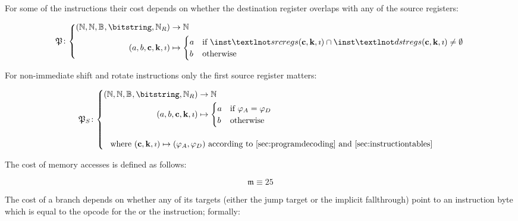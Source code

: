 For some of the instructions their cost depends on whether the destination register overlaps with any of the source registers:

\begin{equation}
  \mathfrak{P}\colon \abracegroup{
    (\N, \N, \blob, \bitstring, \pvmreg) &\to \N\\
    (a, b, \mathbf{c}, \mathbf{k}, \imath) &\mapsto \begin{cases}
      a &\when \inst¬srcregs(\mathbf{c}, \mathbf{k}, \imath) \cap \inst¬dstregs(\mathbf{c}, \mathbf{k}, \imath) \neq \emptyset \\
      b &\otherwise
    \end{cases}
  }
\end{equation}

For non-immediate shift and rotate instructions only the first source register matters:

\begin{equation}
  \mathfrak{P}_{S}\colon \abracegrouptwo{
    (\N, \N, \blob, \bitstring, \pvmreg) &\to \N\\
    (a, b, \mathbf{c}, \mathbf{k}, \imath) &\mapsto \begin{cases}
      a &\when \reg_A = \reg_D \\
      b &\otherwise
    \end{cases}\\
  }{
    \\[0.2pt]
    &\where (\mathbf{c}, \mathbf{k}, \imath) \mapsto (\reg_A, \reg_D) \text{ according to \ref{sec:programdecoding} and \ref{sec:instructiontables}} \\
  }
\end{equation}

The cost of memory accesses is defined as follows:

\begin{equation}
  \mathfrak{m} \equiv 25
\end{equation}

The cost of a branch depends on whether any of its targets (either the jump target or the implicit fallthrough) point to an instruction byte which is equal to the opcode for the  or the  instruction; formally:

